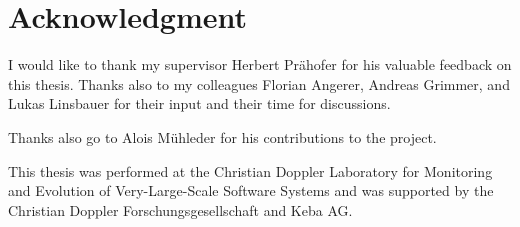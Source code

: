 \chapter*{Acknowledgment}

I would like to thank my supervisor Herbert Prähofer for his valuable feedback on this thesis. Thanks also to my 
colleagues Florian Angerer, Andreas Grimmer, and Lukas Linsbauer for their input and their time for discussions.

Thanks also go to Alois Mühleder for his contributions to the project.

This thesis was performed at the Christian Doppler Laboratory for Monitoring and Evolution of Very-Large-Scale Software 
Systems and was supported by the Christian Doppler \foreignlanguage{ngerman}{Forschungsgesellschaft} and Keba AG.
